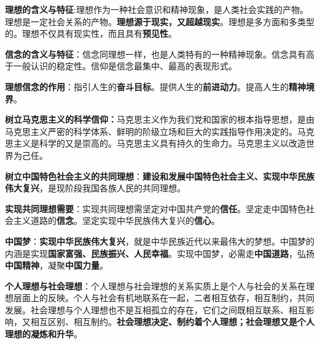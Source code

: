 {\textbf{{理想的含义与特征}}:理想作为一种社会意识和精神现象，是人类社会实践的产物。理想是一定社会关系的产物。{\textbf{理想源于现实，又超越现实}}。理想是多方面和多类型的。理想不仅具有现实性，而且具有{\textbf{预见性}}。}

{\textbf{{信念的含义与特征}}：信念同理想一样，也是人类特有的一种精神现象。信念具有高于一般认识的稳定性。信仰是信念最集中、最高的表现形式。}

{\textbf{{理想信念的作用}}：指引人生的{\textbf{奋斗目标}}。提供人生的\textbf{{前进动力}}。提高人生的{\textbf{精神境界}}。}

{\textbf{{树立马克思主义的科学信仰：}}马克思主义作为我们党和国家的根本指导思想，是由马克思主义严密的科学体系、鲜明的阶级立场和巨大的实践指导作用决定的。马克思主义是科学的又是崇高的。马克思主义具有持久的生命力。马克思主义以改造世界为己任。}

{\textbf{{树立中国特色社会主义的共同理想}}：{\textbf{建设和发展中国特色社会主义、实现中华民族伟大复兴}}，是现阶段我国各族人民的共同理想。}

{\textbf{{实现共同理想需要}}：实现共同理想需坚定对中国共产党的\textbf{{信任}}。坚定走中国特色社会主义道路的\textbf{{信念}}。坚定实现中华民族伟大复兴的\textbf{{信心}}。}

{\textbf{{中国梦}}：{\textbf{实现中华民族伟大复兴}}，就是中华民族近代以来最伟大的梦想。中国梦的内涵是实现\textbf{{国家富强、民族振兴、人民幸福}}。实现中国梦，必需走\textbf{{中国道路}}，弘扬\textbf{{中国精神}}，凝聚\textbf{{中国力量}}。}

{\textbf{{个人理想与社会理想}}{：个人理想与社会理想的关系实质上是个人与社会的关系在理想层面上的反映。个人与社会有机地联系在一起，二者相互依存，相互制约，共同发展。社会理想与个人理想也不是互相孤立的存在，它们之间既相互联系、相互影响，又相互区别、相互制约。}\textbf{{社会理想决定、制约着个人理想；社会理想又是个人理想的凝炼和升华}}{。}}
